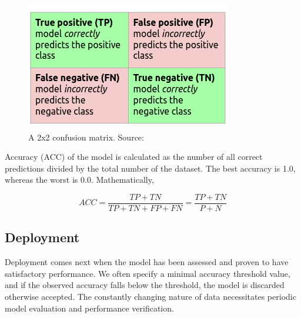 \begin{figure}
    \centering
    \includegraphics[scale=0.5]{chapters/images/conf_mtx.png}
    \caption{A 2x2 confusion matrix. Source: \cite{olakka}}
    \label{fig:confusion_matrix}
\end{figure}

Accuracy (ACC) of the model is calculated as the number of all correct predictions divided by the total number of the dataset. The best accuracy is 1.0, whereas the worst is 0.0. Mathematically, 

\begin{equation}
    ACC = \frac{TP+TN}{TP+TN+FP+FN} = \frac{TP+TN}{P+N}
    \label{eq:accuracy}
\end{equation}


\subsection{Deployment}
Deployment comes next when the model has been assessed and proven to have satisfactory performance. We often specify a minimal accuracy threshold value, and if the observed accuracy falls below the threshold, the model is discarded otherwise accepted. The constantly changing nature of data necessitates periodic model evaluation and performance verification.  